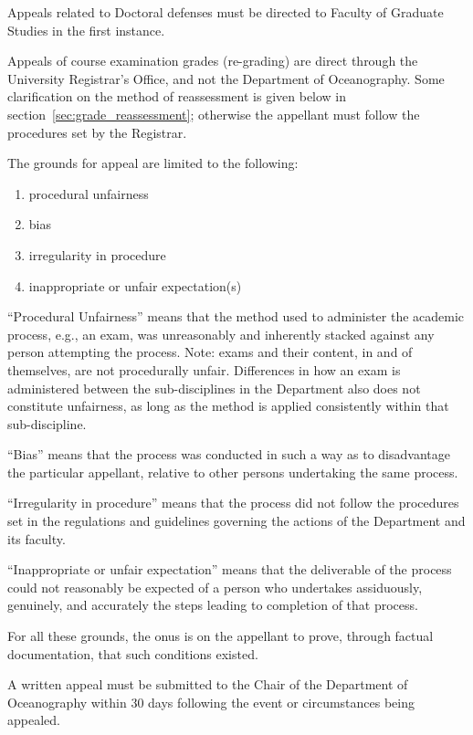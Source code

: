  Appeals related to Doctoral defenses must be directed to Faculty of
Graduate Studies in the first instance. 

 Appeals of course examination grades (re-grading) are direct through
the University Registrar's Office, and not the Department of Oceanography.
Some clarification on the method of reassessment is given below in
section~\ref{sec:grade_reassessment}; otherwise the appellant must follow the
procedures set by the Registrar. 
 
 The grounds for appeal are limited to the following:
\begin{enumerate} \item procedural unfairness \item bias \item irregularity in
        procedure \item inappropriate or unfair expectation(s) \end{enumerate}

``Procedural Unfairness'' means that the method used to administer the academic
process, e.g., an exam, was unreasonably and inherently stacked against any
person attempting the process.  Note: exams and their content, in and of
themselves, are not procedurally unfair.  Differences in how an exam is
administered between the sub-disciplines in the Department also does not
constitute unfairness, as long as the method is applied consistently within
that sub-discipline.  

``Bias'' means that the process was conducted in such a way as to disadvantage the
particular appellant, relative to other persons undertaking the same process.    

``Irregularity in procedure'' means that the process did not follow the
procedures set in the regulations and guidelines governing the actions of the
Department and its faculty.  

``Inappropriate or unfair expectation'' means that the deliverable of the
process could not reasonably be expected of a person who undertakes
assiduously, genuinely, and accurately the steps leading to completion of that
process.   

For all these grounds, the onus is on the appellant to prove, through factual
documentation, that such conditions existed. 

 A written appeal must be submitted to the Chair of the Department of
Oceanography within 30 days following the event or circumstances being
appealed. 

